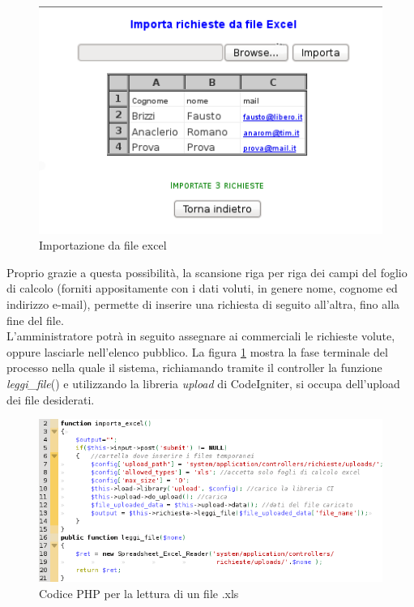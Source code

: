 \begin{figure}[!ht]
\centering
  \includegraphics[scale=0.8]{./images/importaExcelScreen.png}
\caption{Importazione da file excel}
\label{excel}
\end{figure}

\noindent
Proprio grazie a questa possibilit\`a, la scansione riga per riga dei campi del foglio di calcolo (forniti appositamente con i dati voluti, in genere nome, cognome ed indirizzo e-mail), permette di inserire una richiesta di seguito all'altra, fino alla fine del file.\\
 L'amministratore potr\`a in seguito assegnare ai commerciali le richieste volute, oppure lasciarle nell'elenco pubblico. 
\newpage
\noindent
La figura \ref{excel} mostra la fase terminale del processo nella quale il sistema, richiamando tramite il controller la funzione \textit{leggi\_file}() e utilizzando la libreria \textit{upload} di CodeIgniter, si occupa dell'upload dei file desiderati.

\begin{figure}[!ht]
\centering
  \includegraphics[scale=0.9]{./images/codiceexcel.png}
\caption{Codice PHP per la lettura di un file .xls}
\label{excelcode}
\end{figure}

